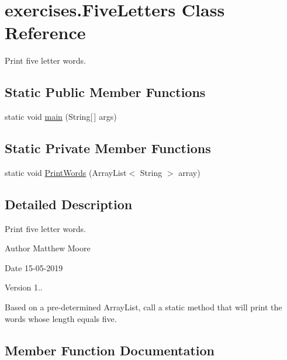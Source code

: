 \hypertarget{classexercises_1_1_five_letters}{}\section{exercises.\+Five\+Letters Class Reference}
\label{classexercises_1_1_five_letters}


Print five letter words.  


\subsection*{Static Public Member Functions}
\begin{DoxyCompactItemize}
\item 
static void \mbox{\hyperlink{classexercises_1_1_five_letters_a92cc909284fd4165c29d5ab64a9313fe}{main}} (String\mbox{[}$\,$\mbox{]} args)
\end{DoxyCompactItemize}
\subsection*{Static Private Member Functions}
\begin{DoxyCompactItemize}
\item 
static void \mbox{\hyperlink{classexercises_1_1_five_letters_a348b407c7defcb69c0d97d0e2467ca4d}{Print\+Words}} (Array\+List$<$ String $>$ array)
\end{DoxyCompactItemize}


\subsection{Detailed Description}
Print five letter words. 

\begin{DoxyAuthor}{Author}
Matthew Moore 
\end{DoxyAuthor}
\begin{DoxyDate}{Date}
15-\/05-\/2019 
\end{DoxyDate}
\begin{DoxyVersion}{Version}
1..
\end{DoxyVersion}
Based on a pre-\/determined Array\+List, call a static method that will print the words whose length equals five. 

\subsection{Member Function Documentation}
\mbox{\label{classexercises_1_1_five_letters_a92cc909284fd4165c29d5ab64a9313fe}} 
